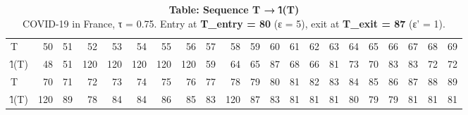 \begin{table}[t]
\caption*{
{\large \textbf{Table: Sequence T → l̂(T)}} \\ 
{\small COVID-19 in France, τ = 0.75. Entry at \textbf{T\_entry = 80} (ε = 5), exit at \textbf{T\_exit = 87} (ε' = 1).}
} 
\begin{tabular*}{\linewidth}{@{\extracolsep{\fill}}lrrrrrrrrrrrrrrrrrrrr}
\toprule
 &  &  &  &  &  &  &  &  &  &  &  &  &  &  &  &  &  &  &  &  \\ 
\midrule\addlinespace[2.5pt]
T & 50 & 51 & 52 & 53 & 54 & 55 & 56 & 57 & 58 & 59 & 60 & 61 & 62 & 63 & 64 & 65 & 66 & 67 & 68 & 69 \\ 
l̂(T) & 48 & 51 & 120 & 120 & 120 & 120 & 120 & 59 & 64 & 65 & 87 & 68 & 66 & 81 & 73 & 70 & 83 & 83 & 72 & 72 \\ 
T & 70 & 71 & 72 & 73 & 74 & 75 & 76 & 77 & 78 & 79 & 80 & 81 & 82 & 83 & 84 & 85 & 86 & 87 & 88 & 89 \\ 
l̂(T) & 120 & 89 & 78 & 84 & 84 & 86 & 85 & 83 & 120 & 87 & 83 & 81 & 81 & 81 & 80 & 79 & 79 & 81 & 81 & 81 \\ 
\bottomrule
\end{tabular*}
\end{table}

